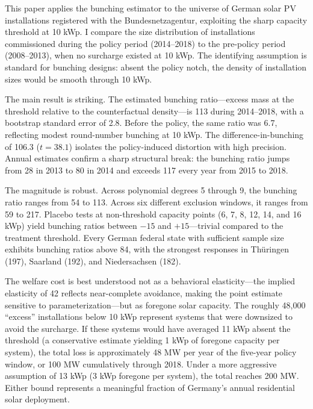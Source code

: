 \documentclass[12pt]{article}
\begin{document}
This paper applies the \citet{kleven2013using} bunching estimator to the universe of German solar PV installations registered with the Bundesnetzagentur, exploiting the sharp capacity threshold at 10 kWp. I compare the size distribution of installations commissioned during the policy period (2014--2018) to the pre-policy period (2008--2013), when no surcharge existed at 10 kWp. The identifying assumption is standard for bunching designs: absent the policy notch, the density of installation sizes would be smooth through 10 kWp.

The main result is striking. The estimated bunching ratio---excess mass at the threshold relative to the counterfactual density---is 113 during 2014--2018, with a bootstrap standard error of 2.8. Before the policy, the same ratio was 6.7, reflecting modest round-number bunching at 10 kWp. The difference-in-bunching of 106.3 ($t = 38.1$) isolates the policy-induced distortion with high precision. Annual estimates confirm a sharp structural break: the bunching ratio jumps from 28 in 2013 to 80 in 2014 and exceeds 117 every year from 2015 to 2018.

The magnitude is robust. Across polynomial degrees 5 through 9, the bunching ratio ranges from 54 to 113. Across six different exclusion windows, it ranges from 59 to 217. Placebo tests at non-threshold capacity points (6, 7, 8, 12, 14, and 16 kWp) yield bunching ratios between $-15$ and $+15$---trivial compared to the treatment threshold. Every German federal state with sufficient sample size exhibits bunching ratios above 84, with the strongest responses in Th\"{u}ringen (197), Saarland (192), and Niedersachsen (182).

The welfare cost is best understood not as a behavioral elasticity---the implied elasticity of 42 reflects near-complete avoidance, making the point estimate sensitive to parameterization---but as foregone solar capacity. The roughly 48,000 ``excess'' installations below 10 kWp represent systems that were downsized to avoid the surcharge. If these systems would have averaged 11 kWp absent the threshold (a conservative estimate yielding 1 kWp of foregone capacity per system), the total loss is approximately 48 MW per year of the five-year policy window, or 100 MW cumulatively through 2018. Under a more aggressive assumption of 13 kWp (3 kWp foregone per system), the total reaches 200 MW. Either bound represents a meaningful fraction of Germany's annual residential solar deployment.
\end{document}
